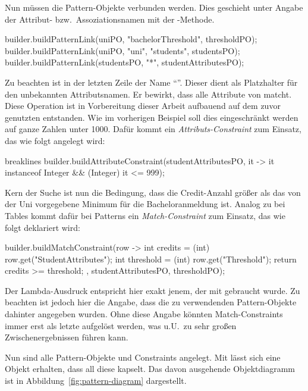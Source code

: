 Nun müssen die Pattern-Objekte verbunden werden.
Dies geschieht unter Angabe der Attribut- bzw.\ Assoziationsnamen mit der -Methode.

\begin{jcodeblock}
    builder.buildPatternLink(uniPO, "bachelorThreshold", thresholdPO);
    builder.buildPatternLink(uniPO, "uni", "students", studentsPO);
    builder.buildPatternLink(studentsPO, "*", studentAttributesPO);
\end{jcodeblock}

Zu beachten ist in der letzten Zeile der Name ``\code{*}''.
Dieser dient als Platzhalter für den unbekannten Attributsnamen.
Er bewirkt, dass  alle Attribute von  matcht.
Diese Operation ist in Vorbereitung dieser Arbeit aufbauend auf dem zuvor genutzten  entstanden.
Wie im vorherigen Beispiel soll dies eingeschränkt werden auf ganze Zahlen unter 1000.
Dafür kommt ein \emph{Attributs-Constraint} zum Einsatz, das wie folgt angelegt wird:

\begin{jcodeblock*}{breaklines}
    builder.buildAttributeConstraint(studentAttributesPO, it -> it instanceof Integer && (Integer) it <= 999);
\end{jcodeblock*}

Kern der Suche ist nun die Bedingung, dass die Credit-Anzahl größer als das von der Uni vorgegebene Minimum für die Bacheloranmeldung ist.
Analog zu  bei Tables kommt dafür bei Patterns ein \emph{Match-Constraint} zum Einsatz,
das wie folgt deklariert wird:

\begin{jcodeblock}
    builder.buildMatchConstraint(row -> {
        int credits = (int) row.get("StudentAttributes");
        int threshold = (int) row.get("Threshold");
        return credits >= threshold;
    }, studentAttributesPO, thresholdPO);
\end{jcodeblock}

Der Lambda-Ausdruck entspricht hier exakt jenem, der mit  gebraucht wurde.
Zu beachten ist jedoch hier die Angabe, dass die zu verwendenden Pattern-Objekte dahinter angegeben wurden.
Ohne diese Angabe könnten Match-Constraints immer erst als letzte aufgelöst werden,
was u.U.\ zu sehr großen Zwischenergebnissen führen kann.

Nun sind alle Pattern-Objekte und Constraints angelegt.
Mit  lässt sich eine Objekt erhalten, dass all diese kapselt.
Das davon ausgehende Objektdiagramm ist in Abbildung~\ref{fig:pattern-diagram} dargestellt.

